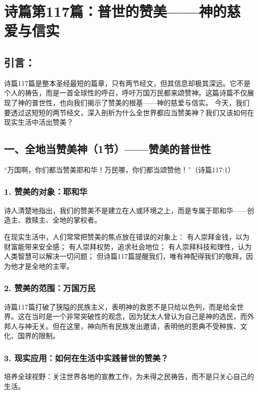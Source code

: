 \documentclass[a4paper, 12pt]{article}
\begin{document}
\section{诗篇第117篇：普世的赞美——神的慈爱与信实}


\subsection*{引言：}
诗篇117篇是整本圣经最短的篇章，只有两节经文，但其信息却极其深远。它不是个人的祷告，而是一首全球性的呼召，呼吁万国万民都来颂赞神。这篇诗篇不仅展现了神的普世性，也向我们揭示了赞美的根基——神的慈爱与信实。
今天，我们要透过这短短的两节经文，深入剖析为什么全世界都应当赞美神？我们又该如何在现实生活中活出赞美？

\subsection*{一、全地当赞美神（1节）——赞美的普世性}
“万国啊，你们都当赞美耶和华！万民哪，你们都当颂赞他！”（诗篇117:1）

\subsubsection*{1. 赞美的对象：耶和华}
\hspace{0.6cm}诗人清楚地指出，我们的赞美不是建立在人或环境之上，而是专属于耶和华——创造主、救赎主、全地的掌权者。

在现实生活中，人们常常把赞美的焦点放在错误的对象上：
有人崇拜金钱，以为财富能带来安全感；
有人崇拜权势，追求社会地位；
有人崇拜科技和理性，认为人类智慧可以解决一切问题；
但诗篇117篇提醒我们，唯有神配得我们的敬拜，因为他才是全地的主宰。

\subsubsection*{2. 赞美的范围：万国万民}
诗篇117篇打破了狭隘的民族主义，表明神的救恩不是只给以色列，而是给全世界。这在当时是一个非常突破性的观念，因为犹太人曾认为自己是神的选民，而外邦人与神无关。但在这里，神向所有民族发出邀请，表明他的恩典不受种族、文化、国界的限制。

\subsubsection*{3. 现实应用：如何在生活中实践普世的赞美？}
\hspace{0.6cm}培养全球视野：关注世界各地的宣教工作，为未得之民祷告，而不是只关心自己的生活。
\end{document}
